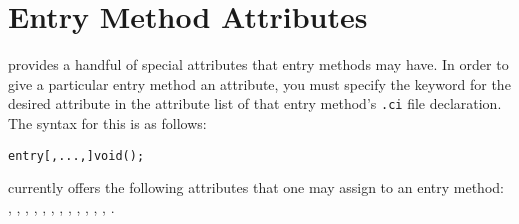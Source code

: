 \section{Entry Method Attributes}

\label{attributes}

\charmpp{}  provides a handful of special attributes that entry methods may have.  In order to give a particular entry method an attribute, you must specify the keyword for the desired
attribute in the attribute list of that entry method's {\tt .ci} file
declaration.  The syntax for this is as follows:

\begin{alltt}
entry [, ..., ] void ();
\end{alltt}

\charmpp{} currently offers the following attributes that one may assign to 
an entry method:
, , , , ,
, , , , ,
, , .

